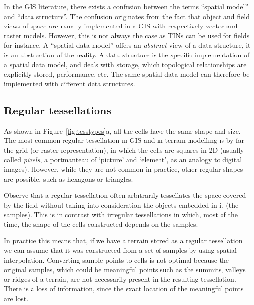 In the GIS literature, there exists a confusion between the terms ``spatial model'' and ``data structure''. 
The confusion originates from the fact that object and field views of space are usually implemented in a GIS with respectively vector and raster models. 
However, this is not always the case as TINs can be used for fields for instance.
A ``spatial data model'' offers an \emph{abstract} view of a data structure, it is an abstraction of the reality.
A data structure is the specific implementation of a spatial data model, and deals with storage, which topological relationships are explicitly stored, performance, etc.
The same spatial data model can therefore be implemented with different data structures.



\subsection{Regular tessellations} 

As shown in Figure~\ref{fig:tesstypes}a, all the cells have the same shape and size.
The most common regular tessellation in GIS and in terrain modelling is by far the grid (or raster representation), in which the cells are squares in 2D (usually called \emph{pixels}, a portmanteau of `picture' and `element', as an analogy to digital images).
However, while they are not common in practice, other regular shapes are possible, such as hexagons or triangles.

%

Observe that a regular tessellation often arbitrarily tessellates the space covered by the field without taking into consideration the objects embedded in it (the samples). 
This is in contrast with irregular tessellations in which, most of the time, the shape of the cells constructed depends on the samples.

In practice this means that, if we have a terrain stored as a regular tessellation we can assume that it was constructed from a set of samples by using spatial interpolation.
Converting sample points to cells is not optimal because the original samples, which could be meaningful points such as the summits, valleys or ridges of a terrain, are not necessarily present in the resulting tessellation. 
There is a loss of information, since the exact location of the meaningful points are lost.

